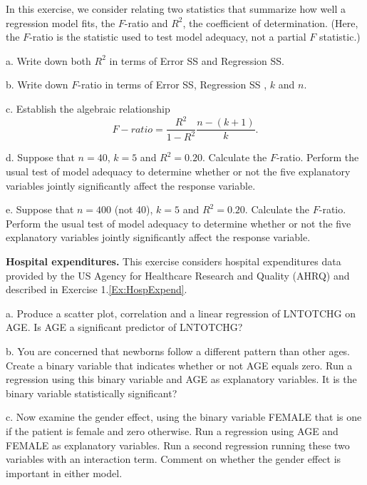 \begin{exercises}

\item In this exercise, we consider relating two statistics that summarize how well a regression model fits,
the $F$-ratio and $R^2$, the coefficient of determination. (Here,
the $F$-ratio is the statistic used to test model adequacy, not a
partial $F$ statistic.)

a.  Write down both $R^2$ in terms of Error SS and Regression SS.

b. Write down $F$-ratio in terms of Error SS, Regression SS , $k$
and $n$.

c. Establish the algebraic relationship
\begin{equation*}
F-ratio = \frac{R^2}{1-R^2} \frac{n-(k+1)}{k}.
\end{equation*}

d.  Suppose that $n = 40$, $k = 5$ and $R^2 = 0.20$. Calculate the
$F$-ratio. Perform the usual test of model adequacy to determine
whether or not the five explanatory variables jointly significantly
affect the response variable.

e.  Suppose that $n = 400$ (not 40), $k = 5$ and $R^2 = 0.20$.
Calculate the $F$-ratio. Perform the usual test of model adequacy to
determine whether or not the five explanatory variables jointly
significantly affect the response variable.


\item \textbf{Hospital expenditures.}\label{Ex:HospExpend4} This exercise considers
hospital expenditures data provided by the US Agency for Healthcare
Research and Quality (AHRQ) and described in Exercise
1.\ref{Ex:HospExpend}.

a. Produce a scatter plot, correlation and a linear regression of
LNTOTCHG on AGE. Is AGE a significant predictor of LNTOTCHG?

b. You are concerned that newborns follow a different pattern than
other ages. Create a binary variable that indicates whether or not
AGE equals zero. Run a regression using this binary variable and AGE
as explanatory variables. It is the binary variable statistically
significant?

c. Now examine the gender effect, using the binary variable FEMALE
that is one if the patient is female and zero otherwise. Run a
regression using AGE and FEMALE as explanatory variables. Run a
second regression running these two variables with an interaction
term. Comment on whether the gender effect is important in either
model.


\end{exercises}
